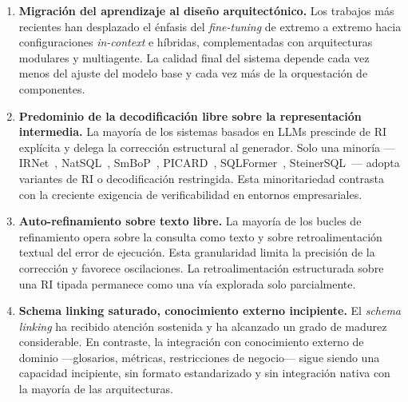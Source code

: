 \begin{enumerate}
    \item \textbf{Migración del aprendizaje al diseño arquitectónico.}
    Los trabajos más recientes han desplazado el énfasis del
    \emph{fine-tuning} de extremo a extremo hacia configuraciones
    \emph{in-context} e híbridas, complementadas con arquitecturas
    modulares y multiagente. La calidad final del sistema depende cada
    vez menos del ajuste del modelo base y cada vez más de la
    orquestación de componentes.

    \item \textbf{Predominio de la decodificación libre sobre la
    representación intermedia.} La mayoría de los sistemas basados en
    \acp{LLM} prescinde de RI explícita y delega la corrección
    estructural al generador. Solo una minoría
    ---IRNet~\cite{guo2019irnet}, NatSQL~\cite{gan2021natsql},
    SmBoP~\cite{SmBoP2021}, PICARD~\cite{PICARD2022},
    SQLFormer~\cite{SQLFormer2023}, SteinerSQL~\cite{SteinerSQL2025}---
    adopta variantes de RI o decodificación restringida. Esta
    minoritariedad contrasta con la creciente exigencia de
    verificabilidad en entornos empresariales.

    \item \textbf{Auto-refinamiento sobre texto libre.} La mayoría de
    los bucles de refinamiento opera sobre la consulta como texto y
    sobre retroalimentación textual del error de ejecución. Esta
    granularidad limita la precisión de la corrección y favorece
    oscilaciones. La retroalimentación estructurada sobre una RI
    tipada permanece como una vía explorada solo parcialmente.

    \item \textbf{Schema linking saturado, conocimiento externo
    incipiente.} El \emph{schema linking} ha recibido atención
    sostenida y ha alcanzado un grado de madurez considerable. En
    contraste, la integración con conocimiento externo de dominio
    ---glosarios, métricas, restricciones de negocio--- sigue siendo
    una capacidad incipiente, sin formato estandarizado y sin
    integración nativa con la mayoría de las arquitecturas.


\end{enumerate}
